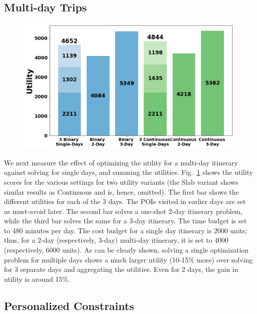 \subsection{Multi-day Trips}

\begin{figure}[t]
\centering
\includegraphics[width=\figwidth]{plots/multivssingle.png}
\label{fig:multi-day}
\end{figure}

We next measure the effect of optimizing the utility for a multi-day itinerary against solving for single days, and summing the utilities.
Fig.~\ref{fig:multi-day} shows the utility scores for the various settings for two utility variants (the Slab variant shows similar results as Continuous and is, hence, omitted).
The first bar shows the different utilities for each of the 3 days. The POIs visited in earlier days are set as must-avoid later.
The second bar solves a one-shot 2-day itinerary problem, while the third bar solves the same for a 3-day itinerary.
The time budget is set to 480 minutes per day.
The cost budget for a single day itinerary is 2000 units; thus, for a 2-day (respectively, 3-day) multi-day itinerary, it is set to 4000 (respectively, 6000 units).
As can be clearly shown, solving a single optimization problem for multiple days shows a much larger utility (10-15\% more) over solving for 3 separate days and aggregating the utilities.
Even for 2 days, the gain in utility is around 15\%.

\subsection{Personalized Constraints}

